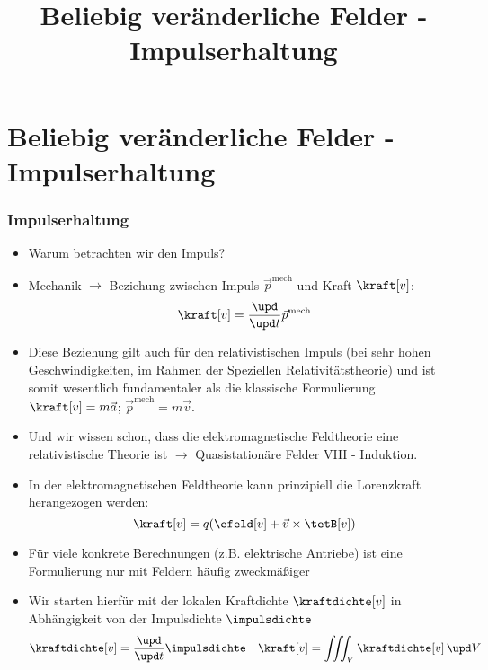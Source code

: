 
  
\title[TET: Beliebig veränderliche Felder - Impulserhaltung]{Beliebig veränderliche Felder - Impulserhaltung}


% 
% 

\maketitle

% 
% 
\section{Beliebig veränderliche Felder - Impulserhaltung}

\begin{frame}
  \frametitle{Impulserhaltung}
  \begin{itemize}[<+->]
  \item Warum betrachten wir den Impuls?
  \item Mechanik \(\to\) Beziehung zwischen \alert{Impuls} \(\vec{p}^\text{mech}\) und \alert{Kraft} \(\kraft[v]\):
    \begin{equation*}
      \kraft[v] = \frac{\upd}{\upd t} \vec{p}^\text{mech}
    \end{equation*}
  \item Diese Beziehung gilt auch für den \alert{relativistischen Impuls} (bei sehr hohen Geschwindigkeiten, im Rahmen der Speziellen Relativitätstheorie) und ist somit wesentlich fundamentaler als die klassische Formulierung \(\kraft[v] = m\vec{a}\); \(\vec{p}^\text{mech} = m \vec{v}\).
  \item Und wir wissen schon, dass die elektromagnetische Feldtheorie eine relativistische Theorie ist \(\to\) Quasistationäre Felder VIII - Induktion.
  \item In der elektromagnetischen Feldtheorie kann prinzipiell die \alert{Lorenzkraft} herangezogen werden:
    \begin{equation*}
      \kraft[v] = q (\efeld[v] + \vec{v} \times \tetB[v])
    \end{equation*}
  \item Für viele konkrete Berechnungen (z.B. elektrische Antriebe) ist eine \alert{Formulierung nur mit Feldern} häufig zweckmäßiger
  \item Wir starten hierfür mit der lokalen \alert{Kraftdichte} \(\kraftdichte[v]\) in Abhängigkeit von der \alert{Impulsdichte} \(\impulsdichte\)
    \begin{equation*}
      \kraftdichte[v] = \frac{\upd}{\upd t} \impulsdichte \quad \kraft[v]=\iiint_V \kraftdichte[v]\, \upd V
      \end{equation*}
  \end{itemize}
\end{frame}


